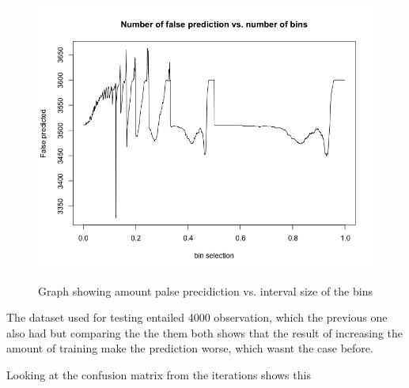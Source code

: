 \documentclass[10pt,a4paper]{article}
\begin{document}
\begin{figure}[H]
\centering
\includegraphics[width = \textwidth]{g2M2vsFewer.png}
\label{fig:false_g_f}
\caption{Graph showing amount palse precidiction vs. interval size of the bins}
\end{figure}

The dataset used for testing entailed  4000 observation, which the previous one also had but comparing the the them both shows that the result of increasing the amount of training make the prediction worse, which wasnt the case before.

Looking at the confusion matrix from the iterations shows this
\end{document}

